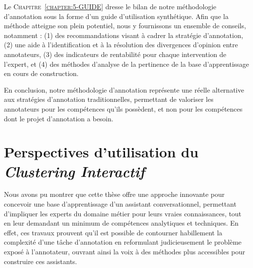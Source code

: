 		Le \textsc{Chapitre~\ref{chapter:5-GUIDE}} dresse le bilan de notre méthodologie d'annotation sous la forme d'un guide d'utilisation synthétique.
		Afin que la méthode atteigne son plein potentiel, nous y fournissons un ensemble de conseils, notamment : (1) des recommandations visant à cadrer la stratégie d'annotation, (2) une aide à l'identification et à la résolution des divergences d'opinion entre annotateurs, (3) des indicateurs de rentabilité pour chaque intervention de l'expert, et (4) des méthodes d'analyse de la pertinence de la base d'apprentissage en cours de construction.
		
		En conclusion, notre méthodologie d'annotation représente une réelle alternative aux stratégies d'annotation traditionnelles, permettant de valoriser les annotateurs pour les compétences qu'ils possèdent, et non pour les compétences dont le projet d'annotation a besoin.
		
		
	\section*{Perspectives d'utilisation du \textit{Clustering Interactif}}
		
		Nous avons pu montrer que cette thèse offre une approche innovante pour concevoir une base d'apprentissage d'un assistant conversationnel, permettant d'impliquer les experts du domaine métier pour leurs vraies connaissances, tout en leur demandant un minimum de compétences analytiques et techniques.
		En effet, ces travaux prouvent qu'il est possible de contourner habillement la complexité d'une tâche d'annotation en reformulant judicieusement le problème exposé à l'annotateur, ouvrant ainsi la voix à des méthodes plus accessibles pour construire ces assistants.


